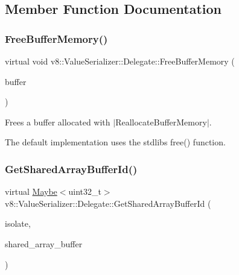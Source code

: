 \subsection{Member Function Documentation}
\mbox{\label{classv8_1_1ValueSerializer_1_1Delegate_a6cea3e757221e6e15b0fdb708482a176}} 
\subsubsection{\texorpdfstring{Free\+Buffer\+Memory()}{FreeBufferMemory()}}
{\footnotesize\ttfamily virtual void v8\+::\+Value\+Serializer\+::\+Delegate\+::\+Free\+Buffer\+Memory (\begin{DoxyParamCaption}\item[{void $\ast$}]{buffer }\end{DoxyParamCaption})\hspace{0.3cm}{\ttfamily [virtual]}}

Frees a buffer allocated with $\vert$\+Reallocate\+Buffer\+Memory$\vert$.

The default implementation uses the stdlib\textquotesingle{}s {\ttfamily free()} function. \mbox{\label{classv8_1_1ValueSerializer_1_1Delegate_a963946ef185d992552e8d9e0e4016137}} 
\subsubsection{\texorpdfstring{Get\+Shared\+Array\+Buffer\+Id()}{GetSharedArrayBufferId()}}
{\footnotesize\ttfamily virtual \mbox{\hyperlink{classv8_1_1Maybe}{Maybe}}$<$uint32\+\_\+t$>$ v8\+::\+Value\+Serializer\+::\+Delegate\+::\+Get\+Shared\+Array\+Buffer\+Id (\begin{DoxyParamCaption}\item[{Isolate $\ast$}]{isolate,  }\item[{\mbox{\hyperlink{classv8_1_1Local}{Local}}$<$ \mbox{\hyperlink{classv8_1_1SharedArrayBuffer}{Shared\+Array\+Buffer}} $>$}]{shared\+\_\+array\+\_\+buffer }\end{DoxyParamCaption})\hspace{0.3cm}{\ttfamily [virtual]}}

